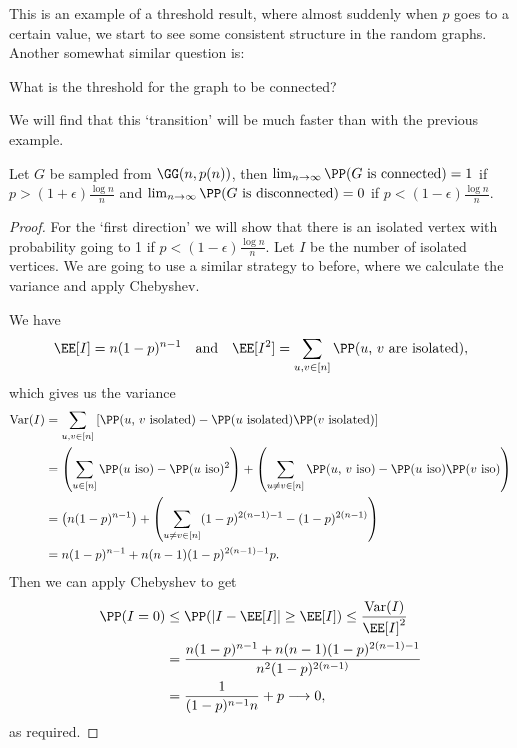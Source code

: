 \documentclass[a4paper]{scrartcl}
\begin{document}
This is an example of a threshold result, where almost suddenly when $p$ goes to a  certain value, we start to see some consistent structure in the random graphs.
Another somewhat similar question is:
\begin{center}
	What is the threshold for the graph to be connected?
\end{center}
We will find that this `transition' will be much faster than with the previous example.

\begin{theorem}
	Let $G$ be sampled from $\GG(n, p(n))$, then $\lim_{n \to \infty} \PP(\text{$G$ is connected}) = 1$ if $p > (1 + \epsilon)\frac{\log n}{n}$ and $\lim_{n \to \infty} \PP(\text{$G$ is disconnected}) = 0$ if $p < (1 - \epsilon) \frac{\log n}{n}$. 
\end{theorem}
\begin{proof}
	For the `first direction' we will show that there is an isolated vertex with probability going to 1 if $p < (1 - \epsilon)\frac{\log n}{n}$.
	Let $I$ be the number of isolated vertices. We are going to use a similar strategy to before, where we calculate the variance and apply Chebyshev.

	We have
	$$
	\EE[I] = n(1 - p)^{n - 1} \quad \text{and} \quad \EE[I^2] = \sum_{u, v \in [n]} \PP(\text{$u$, $v$ are isolated}),
	$$
	which gives us the variance
	\begin{align*}
		\operatorname{Var}(I) &= \sum_{u, v \in [n]} \left[\PP(\text{$u$, $v$ isolated}) - \PP(\text{$u$ isolated})\PP(\text{$v$ isolated})\right] \\
		&= \left(\sum_{u \in [n]} \PP(\text{$u$ iso}) - \PP(\text{$u$ iso})^2\right) +\left( \sum_{u \neq v \in [n]} \PP(\text{$u$, $v$ iso}) - \PP(\text{$u$ iso})\PP(\text{$v$ iso})\right)\\
		&= \left(n(1-p)^{n - 1}\right) +\left( \sum_{u \neq v \in [n]} (1 - p)^{2(n - 1) - 1} - (1 - p)^{2(n - 1)}\right) \\
		&= n(1-p)^{n-1}+n(n-1)(1-p)^{2(n-1)-1} p.
	\end{align*}
	Then we can apply Chebyshev to get
	\begin{align*}
		\PP(I = 0) &\leq \PP(|I - \EE [I]| \geq \EE[I]) \leq \frac{\operatorname{Var}(I)}{\EE[I]^2} \\
		&= \frac{n(1-p)^{n-1}+n(n-1)(1-p)^{2(n-1)-1}}{n^{2}(1-p)^{2(n-1)}} \\
		&= \frac{1}{(1-p)^{n-1} n}+p \longrightarrow 0,
	\end{align*}
	as required.


\end{proof}
\end{document}
